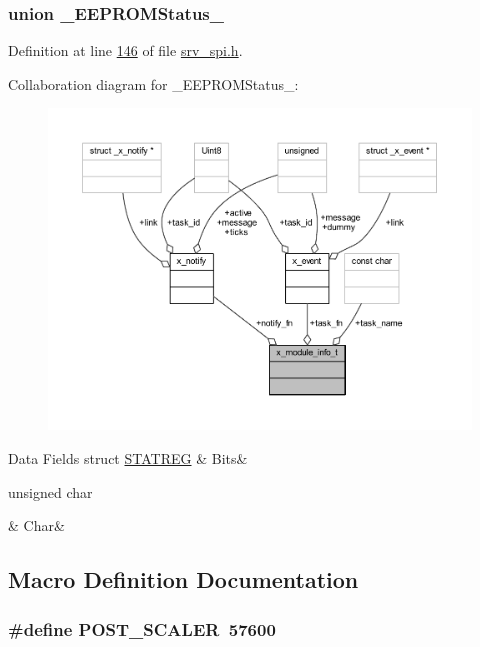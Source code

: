 \subsubsection{union \+\_\+\+E\+E\+P\+R\+O\+M\+Status\+\_\+}


Definition at line \hyperlink{a00013_source_l00146}{146} of file \hyperlink{a00013_source}{srv\+\_\+spi.\+h}.



Collaboration diagram for \+\_\+\+E\+E\+P\+R\+O\+M\+Status\+\_\+\+:\nopagebreak
\begin{figure}[H]
\begin{center}
\leavevmode
\includegraphics[width=350pt]{d5/da6/a01698}
\end{center}
\end{figure}
\begin{DoxyFields}{Data Fields}
\hypertarget{a00013_ab27a4d6dd2be64057b4adc7c0bdc4c07}{struct \hyperlink{a00013_d8/d7d/a00789}{S\+T\+A\+T\+R\+E\+G}}\label{a00013_ab27a4d6dd2be64057b4adc7c0bdc4c07}
&
Bits&
\\
\hline

\hypertarget{a00013_a4362ad9fde44c7f551e727c72cfa111b}{unsigned char}\label{a00013_a4362ad9fde44c7f551e727c72cfa111b}
&
Char&
\\
\hline

\end{DoxyFields}


\subsection{Macro Definition Documentation}
\hypertarget{a00013_a5df9b14c775d6e4eab17c79a729a4dbf}{
\subsubsection[{P\+O\+S\+T\+\_\+\+S\+C\+A\+L\+E\+R}]{\setlength{\rightskip}{0pt plus 5cm}\#define P\+O\+S\+T\+\_\+\+S\+C\+A\+L\+E\+R~57600}}\label{a00013_a5df9b14c775d6e4eab17c79a729a4dbf}


